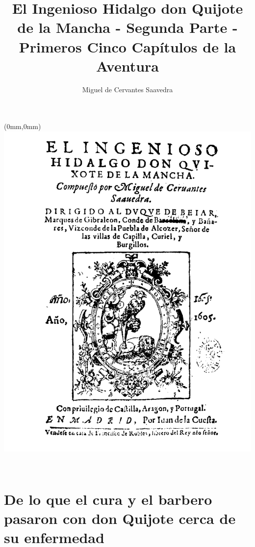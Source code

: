 \documentclass[letterpaper,12pt]{book}
\title{El Ingenioso Hidalgo don Quijote de la Mancha - Segunda Parte - Primeros Cinco Capítulos de la Aventura}
\author{Miguel de Cervantes Saavedra}
\date{}
\begin{document}
\clearpage
\thispagestyle{empty}
\begin{textblock*}{216mm}(0mm,0mm)
  \includegraphics[width=\paperwidth]{cover.png}
\end{textblock*}
	$\,$ %
\clearpage
\thispagestyle{empty}
\maketitle

\tableofcontents
{}

\chapter[De lo que el cura y el barbero pasaron ...]{De lo que el cura y el barbero pasaron con don Quijote cerca de su enfermedad}

\end{document}
